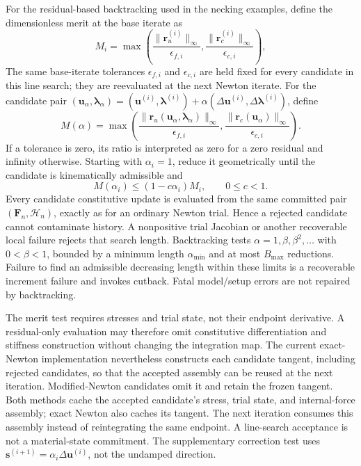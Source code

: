 \documentclass[11pt,a4paper]{article}
\newcommand{\bs}[1]{\boldsymbol{#1}}
\newcommand{\F}{\bs{F}}
\newcommand{\vct}[1]{\mathbf{#1}}
\begin{document}
For the residual-based backtracking used in the necking examples, define the dimensionless merit at the base iterate as
\begin{equation}
M_i=\max\left(
\frac{\lVert\vct r_u^{(i)}\rVert_\infty}{\epsilon_{f,i}},
\frac{\lVert\vct r_c^{(i)}\rVert_\infty}{\epsilon_{c,i}}
\right),
\label{eq:kkt-merit}
\end{equation}
The same base-iterate tolerances $\epsilon_{f,i}$ and $\epsilon_{c,i}$ are held fixed for every candidate in this line search; they are reevaluated at the next Newton iterate. For the candidate pair $(\vct u_\alpha,\vct\lambda_\alpha)=(\vct u^{(i)},\vct\lambda^{(i)})+\alpha(\Delta\vct u^{(i)},\Delta\vct\lambda^{(i)})$, define
\begin{equation}
M(\alpha)=\max\left(
\frac{\lVert\vct r_u(\vct u_\alpha,\vct\lambda_\alpha)\rVert_\infty}{\epsilon_{f,i}},
\frac{\lVert\vct r_c(\vct u_\alpha)\rVert_\infty}{\epsilon_{c,i}}
\right).
\end{equation}
If a tolerance is zero, its ratio is interpreted as zero for a zero residual and infinity otherwise. Starting with $\alpha_i=1$, reduce it geometrically until the candidate is kinematically admissible and
\begin{equation}
M(\alpha_i)\leq (1-c\alpha_i)M_i,
\qquad 0\leq c<1.
\label{eq:kkt-armijo}
\end{equation}
Every candidate constitutive update is evaluated from the same committed pair $(\F_n,\mathcal H_n)$, exactly as for an ordinary Newton trial. Hence a rejected candidate cannot contaminate history. A nonpositive trial Jacobian or another recoverable local failure rejects that search length. Backtracking tests $\alpha=1,\beta,\beta^2,\ldots$ with $0<\beta<1$, bounded by a minimum length $\alpha_{\min}$ and at most $B_{\max}$ reductions. Failure to find an admissible decreasing length within these limits is a recoverable increment failure and invokes cutback. Fatal model/setup errors are not repaired by backtracking.

The merit test requires stresses and trial state, not their endpoint derivative. A residual-only evaluation may
therefore omit constitutive differentiation and stiffness construction without changing the integration map.
The current exact-Newton implementation nevertheless constructs each candidate tangent, including rejected candidates, so that the accepted assembly can be reused at the next iteration. Modified-Newton candidates omit it and retain the frozen tangent. Both methods cache the accepted candidate's stress, trial state, and internal-force assembly; exact Newton also caches its tangent. The next iteration consumes this assembly instead of reintegrating the same endpoint. A line-search acceptance is not a material-state commitment. The supplementary correction test uses $\vct s^{(i+1)}=\alpha_i\Delta\vct u^{(i)}$, not the undamped direction.
\end{document}
